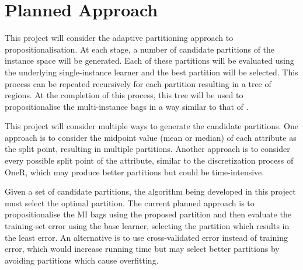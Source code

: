 \documentclass[a4paper,12pt]{article} %
\begin{document}
\section{Planned Approach}

This project will consider the adaptive partitioning approach to propositionalisation.
At each stage, a number of candidate partitions of the instance space will be generated. Each of these partitions will be evaluated using the underlying single-instance learner and the best partition will be selected. This process can be repeated recursively for each partition resulting in a tree of regions. At the completion of this process, this tree will be used to propositionalise the multi-instance bags in a way similar to that of .

This project will consider multiple ways to generate the candidate partitions. One approach is to consider the midpoint value (mean or median) of each attribute as the split point, resulting in multiple partitions. Another approach is to consider every possible split point of the attribute, similar to the discretization process of OneR, which may produce better partitions but could be time-intensive. 

Given a set of candidate partitions, the algorithm being developed in this project must select the optimal partition. 
The current planned approach is to propositionalise the MI bags using the proposed partition and then evaluate the training-set error using the base learner, selecting the partition which results in the least error. An alternative is to use cross-validated error instead of training error, which would increase running time but may select better partitions by avoiding partitions which cause overfitting.

\end{document}
